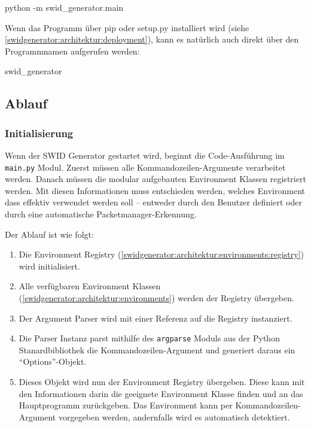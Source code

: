 \begin{bashcode}
python -m swid_generator.main
\end{bashcode}

Wenn das Programm über pip oder setup.py installiert wird (siehe
\autoref{swidgenerator:architektur:deployment}), kann es natürlich auch direkt
über den Programmnamen aufgerufen werden:

\begin{bashcode}
swid_generator
\end{bashcode}

\subsection{Ablauf}

\subsubsection{Initialisierung}
\label{swidgenerator:architektur:initialisierung}

Wenn der SWID Generator gestartet wird, beginnt die Code-Ausführung im
\texttt{main.py} Modul. Zuerst müssen alle Kommandozeilen-Argumente verarbeitet
werden. Danach müssen die modular aufgebauten Environment Klassen registriert
werden. Mit diesen Informationen muss entschieden werden, welches Environment
dass effektiv verwendet werden soll -- entweder durch den Benutzer definiert
oder durch eine automatische Packetmanager-Erkennung.

Der Ablauf ist wie folgt:

\begin{enumerate}
	\item Die Environment Registry
		(\ref{swidgenerator:architektur:environments:registry}) wird initialisiert.
	\item Alle verfügbaren Environment Klassen
		(\ref{swidgenerator:architektur:environments}) werden der Registry
		übergeben.
	\item Der Argument Parser wird mit einer Referenz auf die Registry instanziert.
	\item Die Parser Instanz parst mithilfe des \texttt{argparse} Moduls aus der
		Python Stanardbibliothek die Kommandozeilen-Argument und generiert daraus ein
		\enquote{Options}-Objekt. \item Dieses Objekt wird nun der Environment Registry
		übergeben. Diese kann mit den Informationen darin die geeignete Environment
		Klasse finden und an das Hauptprogramm zurückgeben. Das Environment kann per
		Kommandozeilen-Argument vorgegeben werden, andernfalls wird es automatisch
		detektiert.
\end{enumerate}

